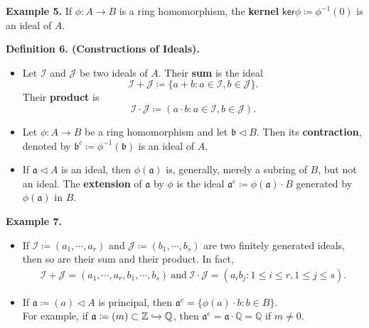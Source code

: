 \documentclass[12pt,a4paper,footinclude=true,headinclude=true]{scrbook} %
\newenvironment{definition}[2][Definition]
    { \begin{mdframed}[backgroundcolor=gray!20] \textbf{#1 #2.}\ }
    {  \end{mdframed}}
\newenvironment{example}[2][Example]
    { \begin{mdframed}[backgroundcolor=gray!20] \textbf{#1 #2.} }
    {  \end{mdframed}}
\begin{document}
\begin{example}{5}
    If $\phi:A\to B$ is a ring homomorphism, the \textbf{kernel} $\mathsf{ker}\phi\coloneqq\phi^{-1}(0)$ is an ideal of $A$.
\end{example}

\begin{definition}{6. (Constructions of Ideals)}
    \begin{itemize}
        \item[(a)] Let $\mathcal{I}$ and $\mathcal{J}$ be two ideals of $A$. Their \textbf{sum} is the ideal 
        \begin{equation*}
            \mathcal{I}+\mathcal{J}\coloneqq\{a+b:a\in\mathcal{I}, b\in\mathcal{J}\}.
        \end{equation*}
        Their \textbf{product} is 
        \begin{equation*}
            \mathcal{I}\cdot\mathcal{J}\coloneqq(a\cdot b:a\in\mathcal{I}, b\in\mathcal{J}).
        \end{equation*}
        \item[(b)] Let $\phi:A\to B$ be a ring homomorphism and let $\mathfrak{b}\triangleleft B$. Then its \textbf{contraction}, denoted by $\mathfrak{b}^c\coloneqq\phi^{-1}(\mathfrak{b})$ is an ideal of $A$.
        \item[(c)] If $\mathfrak{a}\triangleleft A$ is an ideal, then $\phi(\mathfrak{a})$ is, generally, merely a subring of $B$, but not an ideal. The \textbf{extension} of $\mathfrak{a}$ by $\phi$ is the ideal $\mathfrak{a}^e\coloneqq\phi(\mathfrak{a})\cdot B$ generated by $\phi(\mathfrak{a})$ in $B$. 
    \end{itemize}
\end{definition}

\begin{example}{7}
    \begin{itemize}
        \item[(a)] If $\mathcal{I}\coloneqq(a_1,\cdots,a_r)$ and $\mathcal{J}\coloneqq(b_1,\cdots,b_s)$ are two finitely generated ideals, then so are their sum and their product. In fact,
        \begin{align*}
            \mathcal{I}+\mathcal{J}=(a_1,\cdots,a_r,b_1,\cdots,b_s)\ \text{and}\ \mathcal{I}\cdot\mathcal{J}=
            (a_ib_j:1\leq i\leq r, 1\leq j\leq s).
        \end{align*}
        \item[(b)] If $\mathfrak{a}\coloneqq(a)\triangleleft A$ is principal, then $\mathfrak{a}^e=\{\phi(a)\cdot b:b\in B\}$.\\
        For example, if $\mathfrak{a}\coloneqq(m)\subset\mathbb{Z} \xhookrightarrow{} \mathbb{Q}$, then $\mathfrak{a}^e=\mathfrak{a}\cdot\mathbb{Q}=\mathbb{Q}$ if $m\neq0$.
    \end{itemize}
\end{example}
\end{document}
